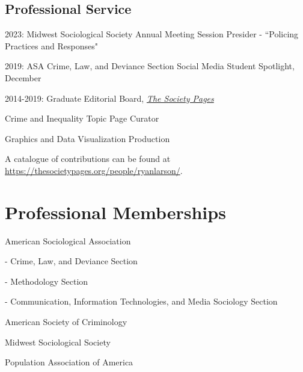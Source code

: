 \documentclass[letterpaper]{article}
\renewenvironment{itemize}{
  \begin{list}{}{
    \setlength{\leftmargin}{1.5em}
  }
}{
  \end{list}
}
\begin{document}
\subsection*{Professional Service}

\begin{itemize}

\item 2023: Midwest Sociological Society Annual Meeting Session Presider - ``Policing Practices and Responses"

\item 2019: ASA Crime, Law, and Deviance Section Social Media Student Spotlight, December

\item  2014-2019:  Graduate Editorial Board, \href{http://thesocietypages.org/}{\textit{The Society Pages}}
\begin{itemize}
\item Crime and Inequality Topic Page Curator
\item Graphics and Data Visualization Production
\item A catalogue of contributions can be found at \href{https://thesocietypages.org/people/ryanlarson/}{https://thesocietypages.org/people/ryanlarson/}.
\end{itemize}

\end{itemize}









\section*{\textbf{Professional Memberships}}
\begin{itemize}

\item American Sociological Association
\begin{itemize}
\item - Crime, Law, and Deviance Section
\item - Methodology Section
\item - Communication, Information Technologies, and Media Sociology Section
\end{itemize}
\item American Society of Criminology
\item Midwest Sociological Society
\item Population Association of America

\end{itemize}
\end{document}

